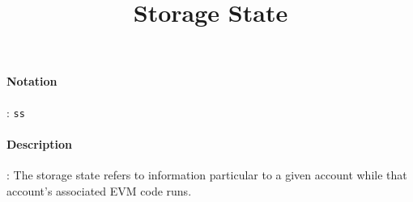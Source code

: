 \documentclass[10pt,a4paper,oneside]{scrartcl}
\author{}
\title{Storage State}
\date{}
\begin{document}
\maketitle
\paragraph{Notation}: \texttt{ss}
\paragraph{Description}: The storage state refers to information particular to a given account while that account's associated EVM code runs.

\printbibliography
\end{document}
